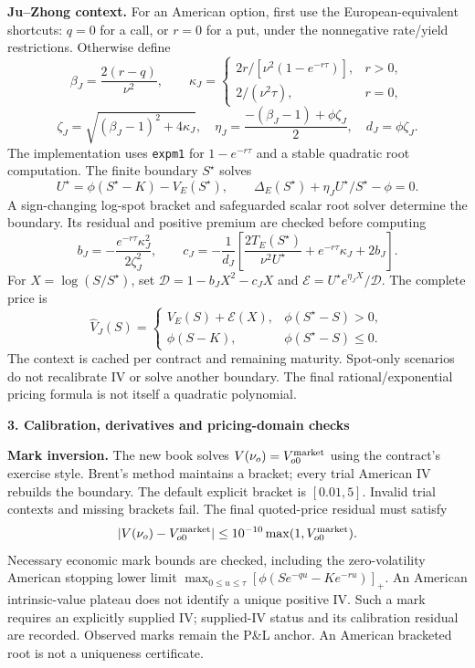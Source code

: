 \documentclass[11pt,a4paper]{article}
\begin{document}
\textbf{Ju--Zhong context.}
For an American option, first use the European-equivalent shortcuts: $q=0$ for
a call, or $r=0$ for a put, under the nonnegative rate/yield restrictions.
Otherwise define
\[
 \beta_J=\frac{2(r-q)}{\nu^2},\qquad
 \kappa_J=\begin{cases}
 2r/[\nu^2(1-e^{-r\tau})],&r>0,\\
 2/(\nu^2\tau),&r=0,
 \end{cases}
\]
\[
 \zeta_J=\sqrt{(\beta_J-1)^2+4\kappa_J},\quad
 \eta_J=\frac{-(\beta_J-1)+\phi\zeta_J}{2},\quad
 d_J=\phi\zeta_J.
\]
The implementation uses \texttt{expm1} for $1-e^{-r\tau}$ and a stable quadratic
root computation. The finite boundary $S^\star$ solves
\[
 U^\star=\phi(S^\star-K)-V_E(S^\star),\qquad
 \Delta_E(S^\star)+\eta_J U^\star/S^\star-\phi=0.
\]
A sign-changing log-spot bracket and safeguarded scalar root solver determine
the boundary. Its residual and positive premium are checked before computing
\[
 b_J=-\frac{e^{-r\tau}\kappa_J^2}{2\zeta_J^2},\qquad
 c_J=-\frac{1}{d_J}\left[
 \frac{2T_E(S^\star)}{\nu^2U^\star}+e^{-r\tau}\kappa_J+2b_J\right].
\]
For $X=\log(S/S^\star)$, set $\mathcal D=1-b_JX^2-c_JX$ and
$\mathcal E=U^\star e^{\eta_JX}/\mathcal D$. The complete price is
\[
 \widehat V_J(S)=\begin{cases}
 V_E(S)+\mathcal E(X),&\phi(S^\star-S)>0,\\
 \phi(S-K),&\phi(S^\star-S)\leq0.
 \end{cases}
\]
The context is cached per contract and remaining maturity. Spot-only scenarios
do not recalibrate IV or solve another boundary. The final rational/exponential
pricing formula is not itself a quadratic polynomial.

\newpage
\textbf{3. Calibration, derivatives and pricing-domain checks}

\textbf{Mark inversion.}
The new book solves $V(\nu_o)=V_{o0}^{\rm market}$ using the contract's exercise
style. Brent's method maintains a bracket; every trial American IV rebuilds the
boundary. The default explicit bracket is $[0.01,5]$. Invalid trial contexts and
missing brackets fail. The final quoted-price residual must satisfy
\[
 |V(\nu_o)-V_{o0}^{\rm market}|\leq10^{-10}\max(1,V_{o0}^{\rm market}).
\]
Necessary economic mark bounds are checked, including the zero-volatility
American stopping lower limit
$\max_{0\leq u\leq\tau}[\phi(Se^{-qu}-Ke^{-ru})]_+$.
An American intrinsic-value plateau does not identify a unique positive IV.
Such a mark requires an explicitly supplied IV; supplied-IV status and its
calibration residual are recorded. Observed marks remain the P\&L anchor.
An American bracketed root is not a uniqueness certificate.
\end{document}
